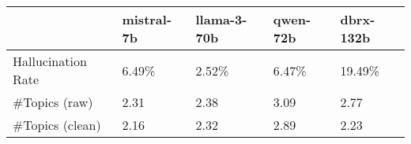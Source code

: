 \begin{tabular}{lllll}
\toprule
 & mistral-7b & llama-3-70b & qwen-72b & dbrx-132b \\
\midrule
Hallucination Rate & 6.49\% & 2.52\% & 6.47\% & 19.49\% \\
\#Topics (raw) & 2.31 & 2.38 & 3.09 & 2.77 \\
\#Topics (clean) & 2.16 & 2.32 & 2.89 & 2.23 \\
\bottomrule
\end{tabular}
